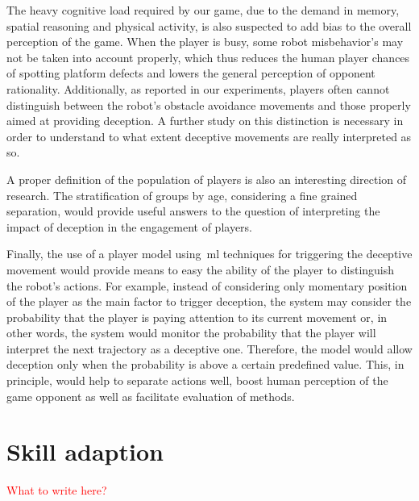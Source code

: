The heavy cognitive load required by our game, due to the demand in memory, spatial reasoning and  physical activity, is also suspected to add bias to the overall perception of the game. When the player is busy, some robot misbehavior's may not be taken into account properly, which thus reduces the human player chances of spotting platform defects and lowers the general perception of opponent rationality. Additionally, as reported in our experiments, players often cannot distinguish between the robot's obstacle avoidance movements and those properly aimed at providing deception. A further study on this distinction is necessary in order to understand to what extent deceptive movements are really interpreted as so.

A proper definition of the population of players is also an interesting direction of research. The stratification of groups by age, considering a fine grained separation, would provide useful answers to the question of interpreting the impact of deception in the engagement of players.

Finally, the use of a player model using~\gls{ml} techniques for triggering the deceptive movement would provide means to easy the ability of the player to distinguish the robot's actions. For example, instead of considering only momentary position of the player as the main factor to trigger deception, the system may consider the probability that the player is paying attention to its current movement or, in other words, the system would monitor the probability that the player will interpret the next trajectory as a deceptive one. Therefore, the model would allow deception only when the probability is above a certain predefined value. This, in principle, would help to separate actions well, boost human perception of the game opponent as well as facilitate evaluation of methods.

\section{Skill adaption}
\textcolor{red}{What to write here?}